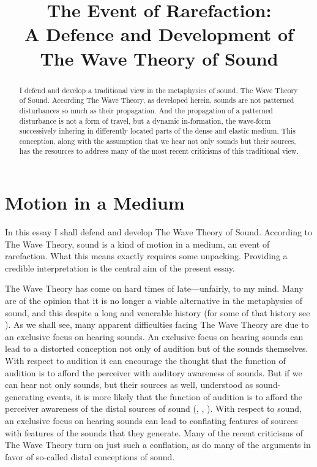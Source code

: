 \documentclass[12pt]{article}
\title{The Event of Rarefaction:\\A Defence and Development of The Wave Theory of Sound}
\author{\myauthor}
\date{} %
\begin{document}
\maketitle
\begin{abstract} %
\noindent I defend and develop a traditional view in the metaphysics of sound, The Wave Theory of Sound. According The Wave Theory, as developed herein, sounds are not patterned disturbances so much as their propagation. And the propagation of a patterned disturbance is not a form of travel, but a dynamic in-formation, the wave-form successively inhering in differently located parts of the dense and elastic medium. This conception, along with the assumption that we hear not only sounds but their sources, has the resources to address many of the most recent criticisms of this traditional view.
\end{abstract}

\setlength{\parindent}{1em}


\section{Motion in a Medium} %
\label{sec:motion_in_a_medium}

In this essay I shall defend and develop The Wave Theory of Sound. According to The Wave Theory, sound is a kind of motion in a medium, an event of rarefaction. What this means exactly requires some unpacking. Providing a credible interpretation is the central aim of the present essay.

The Wave Theory has come on hard times of late---unfairly, to my mind. Many are of the opinion that it is no longer a viable alternative in the metaphysics of sound, and this despite a long and venerable history (for some of that history see \citealt{Pasnau:2000aa}). As we shall see, many apparent difficulties facing The Wave Theory are due to an exclusive focus on hearing sounds. An exclusive focus on hearing sounds can lead to a distorted conception not only of audition but of the sounds themselves. With respect to audition it can encourage the thought that the function of audition is to afford the perceiver with auditory awareness of sounds. But if we can hear not only sounds, but their sources as well, understood as sound-generating events, it is more likely that the function of audition is to afford the perceiver awareness of the distal sources of sound (\citealt{Nudds:2009sf}, \citealt{Leddington:2014aa}, \citealt[chapter 4]{Kalderon:2018oe}). With respect to sound, an exclusive focus on hearing sounds can lead to conflating features of sources with features of the sounds that they generate. Many of the recent criticisms of The Wave Theory turn on just such a conflation, as do many of the arguments in favor of so-called distal conceptions of sound.
\end{document}
